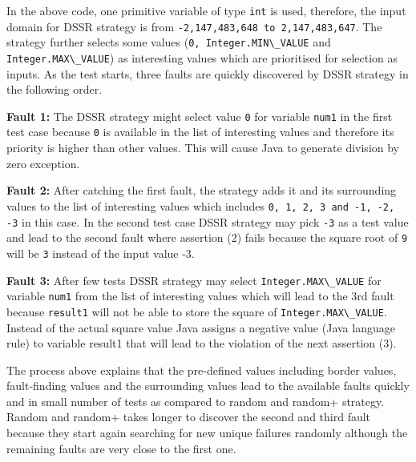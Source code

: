 \documentclass{acm_proc_article-sp}
\begin{document}
In the above code, one primitive variable of type \verb+int+ is used, therefore, the input domain for DSSR strategy is from \verb+-2,147,483,648 to 2,147,483,647+. The strategy further selects some values (\verb+0, Integer.MIN\_VALUE+ and \verb+Integer.MAX\_VALUE+) as interesting values which are prioritised for selection as inputs. 
As the test starts, three faults are quickly discovered by DSSR strategy in the following order.

\indent \textbf{Fault 1:} The DSSR strategy might select value \verb+0+ for variable \verb+num1+  in the first test case because \verb+0+ is available in the list of interesting values and therefore its priority is higher than other values. This will cause Java to generate division by zero exception.

\indent \textbf{Fault 2:} After catching the first fault, the strategy adds it and its surrounding values to the list of interesting values which includes \verb+0, 1, 2, 3 and -1, -2, -3+ in this case. In the second test case DSSR strategy may pick \verb+-3+ as a test value and lead to the second fault where assertion (2) fails because the square root of \verb+9+ will be \verb+3+ instead of the input value -3.

\indent \textbf{Fault 3:} After few tests DSSR strategy may select \verb+Integer.MAX\_VALUE+ for variable \verb+num1+  from the list of interesting values which will lead to the 3rd fault because \verb+result1+ will not be able to store the square of \verb+Integer.MAX\_VALUE+. Instead of the actual square value Java assigns a negative value (Java language rule) to variable result1 that will lead to the violation of the next assertion (3).

The process above explains that the pre-defined values including border values, fault-finding values and the surrounding values lead to the available faults quickly and in small number of tests as compared to random and random+ strategy. Random and random+ takes longer to discover the second and third fault because they start again searching for new unique failures randomly although the remaining faults are very close to the first one. 


\end{document}
